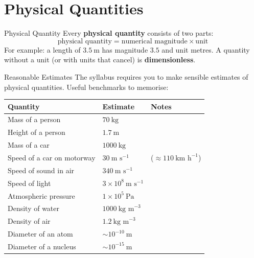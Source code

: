 

\section{Physical Quantities}

\begin{definitionbox}{Physical Quantity}
Every \textbf{physical quantity} consists of two parts:
$$\text{physical quantity} = \text{numerical magnitude} \times \text{unit}$$
For example: a length of $3.5\ \text{m}$ has magnitude $3.5$ and unit metres. A quantity without a unit (or with units that cancel) is \textbf{dimensionless}.
\end{definitionbox}

\begin{keybox}{Reasonable Estimates}
The syllabus requires you to make sensible estimates of physical quantities. Useful benchmarks to memorise:

\begin{center}
\renewcommand{\arraystretch}{1.4}
\begin{tabular}{@{} l l l @{}}
\toprule
\textbf{Quantity} & \textbf{Estimate} & \textbf{Notes} \\
\midrule
Mass of a person & $70\ \text{kg}$ & \\
Height of a person & $1.7\ \text{m}$ & \\
Mass of a car & $1000\ \text{kg}$ & \\
Speed of a car on motorway & $30\ \text{m s}^{-1}$ & ($\approx 110\ \text{km h}^{-1}$) \\
Speed of sound in air & $340\ \text{m s}^{-1}$ & \\
Speed of light & $3\times10^8\ \text{m s}^{-1}$ & \\
Atmospheric pressure & $1\times10^5\ \text{Pa}$ & \\
Density of water & $1000\ \text{kg m}^{-3}$ & \\
Density of air & $1.2\ \text{kg m}^{-3}$ & \\
Diameter of an atom & $\sim10^{-10}\ \text{m}$ & \\
Diameter of a nucleus & $\sim10^{-15}\ \text{m}$ & \\
\bottomrule
\end{tabular}
\end{center}
\end{keybox}


